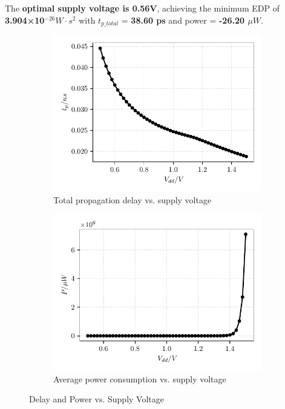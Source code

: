 \documentclass[UTF8,12pt,a4paper]{ctexart}
\begin{document}
The \textbf{optimal supply voltage is 0.56V}, achieving the minimum EDP of \textbf{3.904×10$^{-26} W \cdot s^2$} with $t_{p\_total}$ = \textbf{38.60 ps} and power = \textbf{-26.20 $\mu W$}.

\begin{figure}[htbp]
    \centering
    \begin{subfigure}[b]{0.45\textwidth} %
        \centering
        \includegraphics[width=\textwidth]{Task4/tp_total_vs_volts.pdf} 
        \caption{Total propagation delay vs. supply voltage}
        \label{fig:task4_delay}
    \end{subfigure}
    \hfill %
    \begin{subfigure}[b]{0.45\textwidth}
        \centering
        \includegraphics[width=\textwidth]{Task4/power_vs_volts.pdf} 
        \caption{Average power consumption vs. supply voltage}
        \label{fig:task4_power}
    \end{subfigure}
    \caption{Delay and Power vs. Supply Voltage}
    \label{fig:task4_delay_power}
\end{figure}
\end{document}
